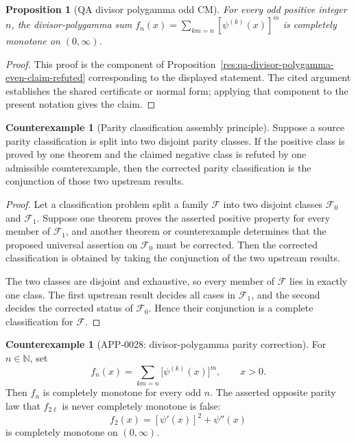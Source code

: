 \documentclass[11pt]{article}
\numberwithin{equation}{section}
\newtheorem{proposition}[theorem]{Proposition}
\theoremstyle{definition}
\newtheorem{counterexample}[theorem]{Counterexample}
\theoremstyle{remark}
\newcommand{\1}{\mathbf 1}
\begin{document}
\begin{proposition}[QA divisor polygamma odd CM]
\label{res:qa-divisor-polygamma-odd-cm}
For every odd positive integer \(n\), the divisor-polygamma sum \(f_n(x)=\sum_{km=n}[\psi^{(k)}(x)]^m\) is completely monotone on \((0,\infty)\).
\end{proposition}

\begin{proof}
This proof is the component of Proposition~\ref{res:qa-divisor-polygamma-even-claim-refuted} corresponding to the displayed statement.  The cited argument establishes the shared certificate or normal form; applying that component to the present notation gives the claim.
\end{proof}

\begin{counterexample}[Parity classification assembly principle]
\label{res:parity-classification-assembly-principle}
Suppose a source parity classification is split into two disjoint parity classes. If the positive class is proved by one theorem and the claimed negative class is refuted by one admissible counterexample, then the corrected parity classification is the conjunction of those two upstream results.
\end{counterexample}

\begin{proof}
Let a classification problem split a family \(\mathcal F\) into two disjoint classes \(\mathcal F_0\) and \(\mathcal F_1\). Suppose one theorem proves the asserted positive property for every member of \(\mathcal F_1\), and another theorem or counterexample determines that the proposed universal assertion on \(\mathcal F_0\) must be corrected. Then the corrected classification is obtained by taking the conjunction of the two upstream results.

The two classes are disjoint and exhaustive, so every member of \(\mathcal F\) lies in exactly one class. The first upstream result decides all cases in \(\mathcal F_1\), and the second decides the corrected status of \(\mathcal F_0\). Hence their conjunction is a complete classification for \(\mathcal F\).
\end{proof}

\begin{counterexample}[APP-0028: divisor-polygamma parity correction]
\label{thm:app28-qa-divisor-polygamma}
For \(n\in\mathbb N\), set
\[
 f_n(x)=\sum_{km=n}\bigl[\psi^{(k)}(x)\bigr]^m,\qquad x>0.
\]
Then \(f_n\) is completely monotone for every odd \(n\).  The asserted
opposite parity law that \(f_{2\ell}\) is never completely monotone is false:
\[
 f_2(x)=[\psi'(x)]^2+\psi''(x)
\]
is completely monotone on \((0,\infty)\).


\end{counterexample}
\end{document}
